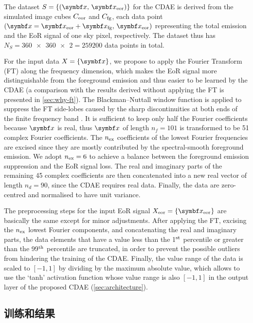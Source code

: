The dataset $S = \{(\B{x}, \,\B{x}_{\R{eor}})\}$ for the CDAE is derived
from the simulated image cubes $C_{\mathrm{eor}}$ and $C_{\mathrm{fg}}$, each data
point $(\B{x} = \B{x}_{\R{eor}} + \B{x}_{\R{fg}}, \,\B{x}_{\R{eor}})$
representing the total emission and the EoR signal of one sky pixel,
respectively.
The dataset thus has $N_S = \num{360x360 x 2} = \num{259200}$
data points in total.

For the input data $X = \{\B{x}\}$, we propose to apply the
Fourier Transform (FT) along the frequency dimension,
which makes the EoR signal more distinguishable from the
foreground emission and thus easier to be learned by the CDAE
(a comparison with the results derived without applying the FT is
presented in \autoref{sec:why-ft}).
The Blackman--Nuttall window function is applied to suppress the
FT side-lobes caused by the sharp discontinuities at both ends
of the finite frequency band \cite{chapman2016}.
It is sufficient to keep only half the Fourier coefficients because
$\B{x}$ is real, thus $\B{x}$ of length $n_f = 101$ is transformed to
be 51 complex Fourier coefficients.
The $n_{\mathrm{ex}}$ coefficients of the lowest Fourier frequencies are
excised since they are mostly contributed by the spectral-smooth
foreground emission.
We adopt $n_{\mathrm{ex}} = 6$ to achieve a balance between the
foreground emission suppression and the EoR signal loss.
The real and imaginary parts of the remaining 45 complex coefficients
are then concatenated into a new real vector of length $n_d = 90$,
since the CDAE requires real data.
Finally, the data are zero-centred and normalised to have unit variance.

The preprocessing steps for the input EoR signal
$X_{\R{eor}} = \{\B{x}_{\R{eor}}\}$
are basically the same except for minor adjustments.
After applying the FT, excising the $n_{\mathrm{ex}}$ lowest Fourier
components, and concatenating the real and imaginary parts,
the data elements that have a value less than the 1$^{\mathrm{st}}$
percentile or greater than the 99$^{\mathrm{th}}$ percentile are truncated,
in order to prevent the possible outliers from hindering the training of
the CDAE.
Finally, the value range of the data is scaled to $[-1, 1]$ by
dividing by the maximum absolute value,
which allows to use the `tanh' activation function whose value range
is also $[-1, 1]$ in the output layer of the proposed CDAE
(\autoref{sec:architecture}).

\subsection{训练和结果}
\label{sec:cdae-results}


